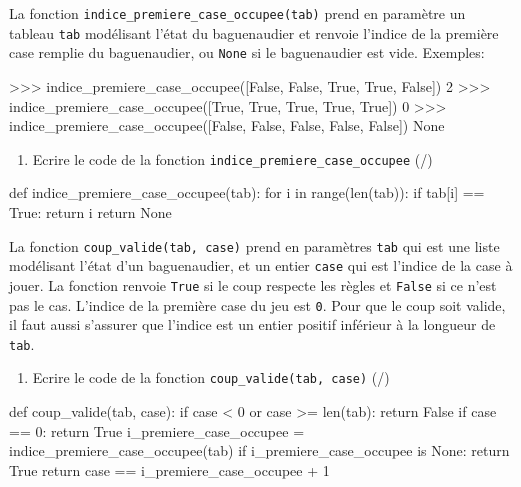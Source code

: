 \medskip

 La fonction \verb|indice_premiere_case_occupee(tab)| prend en paramètre un tableau \texttt{tab} modélisant l'état du baguenaudier et renvoie l'indice de la première case remplie du baguenaudier, ou \texttt{None} si le baguenaudier est vide. Exemples:

    \begin{CodePythontexAlt}[TaillePolice=\large, Largeur=1\linewidth,Centre,Lignes=true,PremLigne=1]{}
>>> indice_premiere_case_occupee([False, False, True, True, False])
2
>>> indice_premiere_case_occupee([True, True, True, True, True])
0
>>> indice_premiere_case_occupee([False, False, False, False, False])
None
    \end{CodePythontexAlt}

    \begin{enumerate}[resume=monDS]
\item Ecrire le code de la fonction \verb|indice_premiere_case_occupee| (/)
\end{enumerate}

\begin{blocvisible}[height=6]
    \begin{CodePythontexAlt}[TaillePolice=\large, Largeur=1\linewidth,Centre,Lignes=true,PremLigne=1]{}
    def indice_premiere_case_occupee(tab):
        for i in range(len(tab)):
            if tab[i] == True:
                return i
        return None
    \end{CodePythontexAlt}
\end{blocvisible}

\pagebreak


 La fonction \verb|coup_valide(tab, case)| prend en paramètres \texttt{tab} qui est une liste modélisant l'état d'un baguenaudier, et un entier \texttt{case} qui est l'indice de la case à jouer. La fonction renvoie \texttt{True} si le coup respecte les règles et \texttt{False} si ce n'est pas le cas. L'indice de la première case du jeu est \texttt{0}. Pour que le coup soit valide, il faut aussi s'assurer que l'indice est un entier positif inférieur à la longueur de \texttt{tab}.


 \begin{enumerate}[resume=monDS]
\item Ecrire le code de la fonction \verb|coup_valide(tab, case)|  (/)
\end{enumerate}

\begin{blocvisible}[height=6]
    \begin{CodePythontexAlt}[TaillePolice=\large, Largeur=1\linewidth,Centre,Lignes=true,PremLigne=1]{}
    def coup_valide(tab, case):
        if case < 0 or case >= len(tab):
            return False
        if case == 0:
            return True
        i_premiere_case_occupee = indice_premiere_case_occupee(tab)
        if i_premiere_case_occupee is None:
            return True
        return case == i_premiere_case_occupee + 1
    \end{CodePythontexAlt}
\end{blocvisible}

